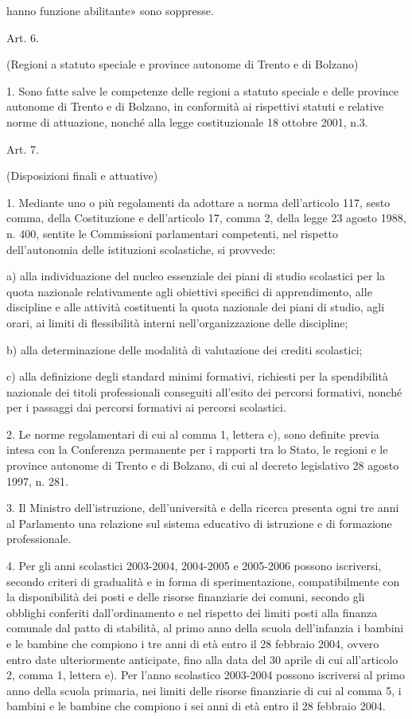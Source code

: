 hanno funzione abilitante» sono soppresse.

Art. 6.

(Regioni a statuto speciale e province autonome di Trento e di Bolzano)

1. Sono fatte salve le competenze delle regioni a statuto speciale e delle province autonome di Trento e di Bolzano, in conformità ai rispettivi statuti e relative norme di attuazione, nonché alla legge costituzionale 18 ottobre 2001, n.3.

Art. 7.

(Disposizioni finali e attuative)

1. Mediante uno o più regolamenti da adottare a norma dell'articolo 117, sesto comma, della Costituzione e dell'articolo 17, comma 2, della legge 23 agosto 1988, n. 400, sentite le Commissioni parlamentari competenti, nel rispetto dell'autonomia delle istituzioni scolastiche, si provvede:

a) alla individuazione del nucleo essenziale dei piani di studio scolastici per la quota nazionale relativamente agli obiettivi specifici di apprendimento, alle discipline e alle attività costituenti la quota nazionale dei piani di studio, agli orari, ai limiti di flessibilità interni nell'organizzazione delle discipline;

b) alla determinazione delle modalità di valutazione dei crediti scolastici;

c) alla definizione degli standard minimi formativi, richiesti per la spendibilità nazionale dei titoli professionali conseguiti all'esito dei percorsi formativi, nonché per i passaggi dai percorsi formativi ai percorsi scolastici.

2. Le norme regolamentari di cui al comma 1, lettera c), sono definite previa intesa con la Conferenza permanente per i rapporti tra lo Stato, le regioni e le province autonome di Trento e di Bolzano, di cui al decreto legislativo 28 agosto 1997, n. 281.

3. Il Ministro dell'istruzione, dell'università e della ricerca presenta ogni tre anni al Parlamento una relazione sul sistema educativo di istruzione e di formazione professionale.

4. Per gli anni scolastici 2003-2004, 2004-2005 e 2005-2006 possono iscriversi, secondo criteri di gradualità e in forma di sperimentazione, compatibilmente con la disponibilità dei posti e delle risorse finanziarie dei comuni, secondo gli obblighi conferiti dall'ordinamento e nel rispetto dei limiti posti alla finanza comunale dal patto di stabilità, al primo anno della scuola dell'infanzia i bambini e le bambine che compiono i tre anni di età entro il 28 febbraio 2004, ovvero entro date ulteriormente anticipate, fino alla data del 30 aprile di cui all'articolo 2, comma 1, lettera e). Per l'anno scolastico 2003-2004 possono iscriversi al primo anno della scuola primaria, nei limiti delle risorse finanziarie di cui al comma 5, i bambini e le bambine che compiono i sei anni di età entro il 28 febbraio 2004.

